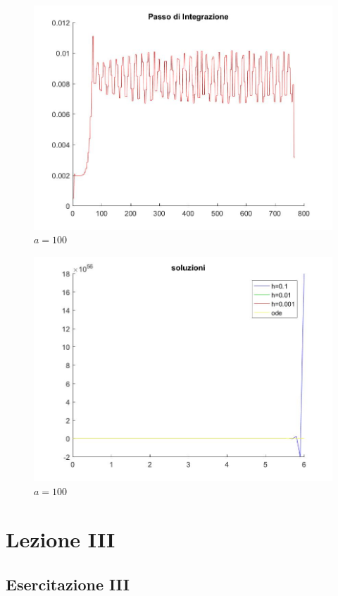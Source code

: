 \documentclass[11pt,a4paper,twoside,openright,titlepage,
headinclude,footinclude,BCOR5mm,
numbers=noenddot,cleardoublepage=empty,
tablecaptionabove]{scrbook}
\begin{document}
\begin{figure}[h!]
\centering
\includegraphics[width=\textwidth]{figs/step_ode_100.jpg}
\caption{$a=100$}
\end{figure}
\begin{figure}[h!]
\centering
\includegraphics[width=\textwidth]{figs/soluzioni_100.jpg}
\caption{$a=100$}
\end{figure}




\chapter{Lezione III}
\section{Esercitazione III}
\end{document}
